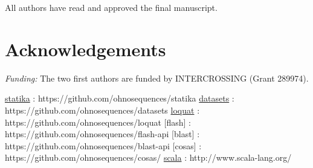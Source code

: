 \documentclass[fleqn,10pt,lineno]{wlpeerj}
\begin{document}
All authors have read and approved the final manuscript.

\section{Acknowledgements}\label{acknowledgements}

\emph{Funding:} The two first authors are funded by INTERCROSSING (Grant
289974).

\protect\hyperlink{statika}{statika} :
https://github.com/ohnosequences/statika
\protect\hyperlink{datasets}{datasets} :
https://github.com/ohnosequences/datasets
\protect\hyperlink{loquat}{loquat} :
https://github.com/ohnosequences/loquat {[}flash{]} :
https://github.com/ohnosequences/flash-api {[}blast{]} :
https://github.com/ohnosequences/blast-api {[}cosas{]} :
https://github.com/ohnosequences/cosas/ \protect\hyperlink{scala}{scala}
: http://www.scala-lang.org/

  

\end{document}
